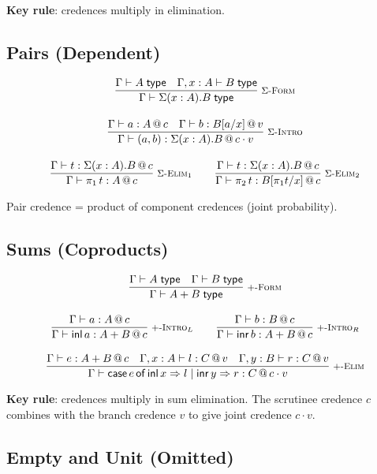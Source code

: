 \documentclass[11pt,a4paper]{article}
\makeatletter
\newcommand{\infer}[3][]{%
  \genfrac{}{}{0.4pt}{0}{#3}{#2}\;\textsc{\footnotesize #1}%
}
\newcommand{\type}{\;\mathsf{type}}
\newcommand{\at}[1]{\,@\,#1}
\makeatother
\begin{document}
\textbf{Key rule}: credences multiply in elimination.

\subsection{Pairs (Dependent)}

\begin{gather}
\infer[\textsc{$\Sigma$-Form}]
  {\Gamma \vdash \Sigma(x : A). B \type}
  {\Gamma \vdash A \type \quad \Gamma, x : A \vdash B \type}
\\[1em]
\infer[\textsc{$\Sigma$-Intro}]
  {\Gamma \vdash (a, b) : \Sigma(x : A). B \at{c \cdot v}}
  {\Gamma \vdash a : A \at{c} \quad \Gamma \vdash b : B[a/x] \at{v}}
\\[1em]
\infer[\textsc{$\Sigma$-Elim$_1$}]
  {\Gamma \vdash \pi_1\,t : A \at{c}}
  {\Gamma \vdash t : \Sigma(x : A). B \at{c}}
\qquad
\infer[\textsc{$\Sigma$-Elim$_2$}]
  {\Gamma \vdash \pi_2\,t : B[\pi_1 t / x] \at{c}}
  {\Gamma \vdash t : \Sigma(x : A). B \at{c}}
\end{gather}

Pair credence = product of component credences (joint probability).

\subsection{Sums (Coproducts)}

\begin{gather}
\infer[\textsc{$+$-Form}]
  {\Gamma \vdash A + B \type}
  {\Gamma \vdash A \type \quad \Gamma \vdash B \type}
\\[1em]
\infer[\textsc{$+$-Intro$_L$}]
  {\Gamma \vdash \mathsf{inl}\,a : A + B \at{c}}
  {\Gamma \vdash a : A \at{c}}
\qquad
\infer[\textsc{$+$-Intro$_R$}]
  {\Gamma \vdash \mathsf{inr}\,b : A + B \at{c}}
  {\Gamma \vdash b : B \at{c}}
\\[1em]
\infer[\textsc{$+$-Elim}]
  {\Gamma \vdash \mathsf{case}\,e\,\mathsf{of}\,\mathsf{inl}\,x \Rightarrow l \mid \mathsf{inr}\,y \Rightarrow r : C \at{c \cdot v}}
  {\Gamma \vdash e : A + B \at{c} \quad \Gamma, x : A \vdash l : C \at{v} \quad \Gamma, y : B \vdash r : C \at{v}}
\end{gather}

\textbf{Key rule}: credences multiply in sum elimination. The scrutinee credence $c$ combines with the branch credence $v$ to give joint credence $c \cdot v$.

\subsection{Empty and Unit (Omitted)}
\end{document}
